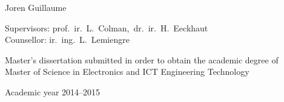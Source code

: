 \documentclass[11pt,british]{article}
\begin{document}
\begin{titlepage}
\begin{center}
\vspace{1.2cm}

Joren Guillaume

\fontsize{12pt}{14pt}
\selectfont

\vspace{3.5cm}

Supervisors: prof.~ir.~L.~Colman,~dr.~ir.~H.~Eeckhaut\\
Counsellor: ir.~ing.~L.~Lemiengre\\

\vspace{2cm}

Master's dissertation submitted in order to obtain the academic degree of\\
Master of Science in Electronics and ICT Engineering Technology

\vspace{1cm}

Academic year 2014--2015

\end{center}
\end{titlepage}

\newpage{}
\thispagestyle{empty}
\mbox{}
\end{document}
